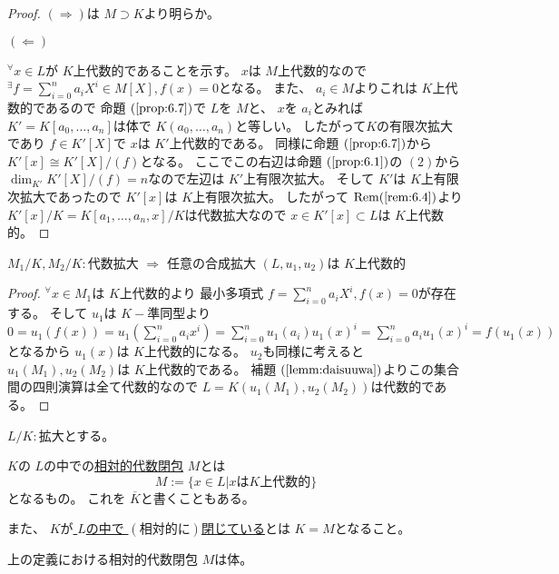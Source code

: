 \documentclass[../master_galois_theory]{subfiles}
\begin{document}
\begin{proof}
  $(\Rightarrow)$は $M \supset K$より明らか。

  $(\Leftarrow)$

  ${}^\forall x \in L$が $K$上代数的であることを示す。
  $x$は $M$上代数的なので ${}^\exists f = \sum_{i=0}^n a_i X^i \in M[X] , f(x) = 0$となる。
  また、 $a_i \in M$よりこれは $K$上代数的であるので
  命題 $(\mathrm{\ref{prop:6.7}})$で $L$を $M$と、 $x$を $a_i$とみれば
  $K' = K[a_0 , \dots , a_n]$は体で $K(a_0 , \dots , a_n)$と等しい。
  したがって$K$の有限次拡大であり $f \in K'[X]$で $x$は $K'$上代数的である。
  同様に命題 $(\mathrm{\ref{prop:6.7}})$から $K'[x] \cong K'[X]/(f)$となる。
  ここでこの右辺は命題 $(\mathrm{\ref{prop:6.1}})$の $(2)$から
  $\dim_{K'} K'[X]/(f) = n$なので左辺は $K'$上有限次拡大。
  そして $K'$は $K$上有限次拡大であったので $K'[x]$は $K$上有限次拡大。
  したがって $\mathrm{Rem} (\mathrm{\ref{rem:6.4}})$より
  $K'[x]/K = K[a_1 , \dots , a_n , x]/K$は代数拡大なので
  $x \in K'[x] \subset L$は $K$上代数的。
\end{proof}

\begin{prop}
  $M_1/K , M_2/K:$代数拡大 $\Rightarrow$ 任意の合成拡大 $(L,u_1,u_2)$は $K$上代数的
\end{prop}

\begin{proof}
  ${}^\forall x \in M_1$は $K$上代数的より
  最小多項式 $f = \sum_{i=0}^n a_i X^i , f(x) = 0$が存在する。
  そして $u_1$は $K-$準同型より $0 = u_1(f(x)) = u_1(\sum_{i=0}^n a_i x^i) = \sum_{i=0}^n u_1(a_i) u_1(x)^i = \sum_{i=0}^n a_i u_1(x)^i = f(u_1(x))$
  となるから $u_1(x)$は $K$上代数的になる。
  $u_2$も同様に考えると $u_1(M_1) , u_2(M_2)$は $K$上代数的である。
  補題 $(\mathrm{\ref{lemm:daisuuwa}})$よりこの集合間の四則演算は全て代数的なので
  $L = K(u_1(M_1) , u_2(M_2))$は代数的である。
\end{proof}

\begin{defi}
  $L/K:$拡大とする。

  $K$の $L$の中での\underline{相対的代数閉包} $M$とは
  \[
  M := \{ x \in L | x は K上代数的\}
  \]
  となるもの。
  これを $\overline{K}$と書くこともある。

  また、 $K$が\underline{ $L$の中で $(相対的に)$閉じている}とは
  $K = M$となること。
\end{defi}

\begin{prop}
  上の定義における相対的代数閉包 $M$は体。
\end{prop}
\end{document}
